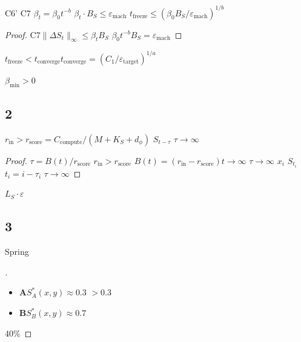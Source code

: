 \begin{theorem}[]\label{thm:freeze}
 C6'  C7  $\beta_t = \beta_0 t^{-b}$ $\beta_t \cdot B_S \leq \varepsilon_{\text{mach}}$ $t_{\text{freeze}} \leq (\beta_0 B_S / \varepsilon_{\text{mach}})^{1/b}$ 
\end{theorem}

\begin{proof}
 C7$\|\Delta S_t\|_\infty \leq \beta_t B_S$ $\beta_0 t^{-b} B_S = \varepsilon_{\text{mach}}$ 
\end{proof}

\textbf{}  $t_{\text{freeze}} < t_{\text{converge}}$$t_{\text{converge}} = (C_1/\varepsilon_{\text{target}})^{1/a}$

\textbf{}  $\beta_{\min} > 0$

\subsection{ 2}

\begin{theorem}[]\label{thm:backlog}
 $r_{\text{in}} > r_{\text{score}} = C_{\text{compute}} / (M + K_S + d_\phi)$ $S_{t-\tau}$  $\tau \to \infty$
\end{theorem}

\begin{proof}
 $\tau = B(t)/r_{\text{score}}$ $r_{\text{in}} > r_{\text{score}}$ $B(t) = (r_{\text{in}} - r_{\text{score}})t \to \infty$  $\tau \to \infty$ $x_i$  $S_{t_i}$ $t_i = i - \tau_i$ $\tau \to \infty$ 
\end{proof}

\textbf{}  $L_S \cdot \varepsilon$

\subsection{ 3}

\begin{theorem}[]\label{thm:multi-fp}
Spring 
\end{theorem}

\begin{proof}[]

\begin{itemize}[nosep]
    \item \textbf{ A}$S_A^*(x,y) \approx 0.3$ $> 0.3$ 
    \item \textbf{ B}$S_B^*(x,y) \approx 0.7$
\end{itemize}
 40\% 
\end{proof}

